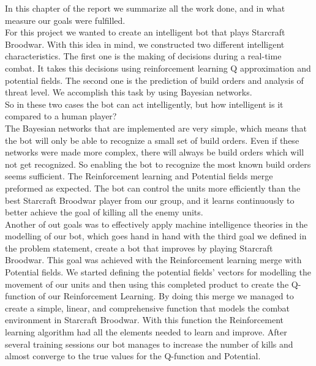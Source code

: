 In this chapter of the report we summarize all the work done, and in what measure our goals were fulfilled. \\

For this project we wanted to create an intelligent bot that plays Starcraft Broodwar. With this idea in mind, we constructed two different intelligent characteristics. The first one is the making of decisions during a real-time combat. It takes this decisions using reinforcement learning Q approximation and potential fields. The second one is the prediction of build orders and analysis of threat level. We accomplish this task by using Bayesian networks. \\

So in these two cases the bot can act intelligently, but how intelligent is it compared to a human player? \\

The Bayesian networks that are implemented are very simple, which means that the bot will only be able to recognize a small set of build orders. Even if these networks were made more complex, there will always be build orders which will not get recognized. So enabling the bot to recognize the most known build orders seems sufficient. The Reinforcement learning and Potential fields merge preformed as expected. The bot can control the units more efficiently than the best Starcraft Broodwar player from our group, and it learns continuously to better achieve the goal of killing all the enemy units. \\

Another of out goals was to effectively apply machine intelligence theories in the modelling of our bot, which goes hand in hand with the third goal we defined in the problem statement, create a bot that improves by playing Starcraft Broodwar. This goal was achieved with the Reinforcement learning merge with Potential fields. We started defining the potential fields' vectors for modelling the movement of our units and then using this completed product to create the Q-function of our Reinforcement Learning. By doing this merge we managed to create a simple, linear, and comprehensive function that models the combat environment in Starcraft Broodwar. With this function the Reinforcement learning algorithm had all the elements needed to learn and improve. After several training sessions our bot manages to increase the number of kills and almost converge to the true values for the Q-function and Potential.\\

